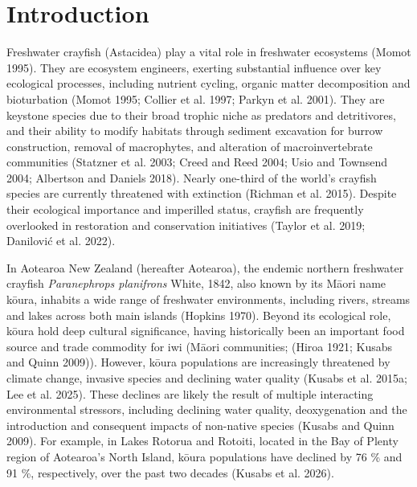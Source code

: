 \documentclass[
  12pt,
  a4paper,
  oneside]{scrbook}
\begin{document}
\section{Introduction}\label{introduction-1}

Freshwater crayfish (Astacidea) play a vital role in freshwater
ecosystems (Momot 1995). They are ecosystem engineers, exerting
substantial influence over key ecological processes, including nutrient
cycling, organic matter decomposition and bioturbation (Momot 1995;
Collier et al. 1997; Parkyn et al. 2001). They are keystone species due
to their broad trophic niche as predators and detritivores, and their
ability to modify habitats through sediment excavation for burrow
construction, removal of macrophytes, and alteration of
macroinvertebrate communities (Statzner et al. 2003; Creed and Reed
2004; Usio and Townsend 2004; Albertson and Daniels 2018). Nearly
one-third of the world's crayfish species are currently threatened with
extinction (Richman et al. 2015). Despite their ecological importance
and imperilled status, crayfish are frequently overlooked in restoration
and conservation initiatives (Taylor et al. 2019; Danilović et al.
2022).

In Aotearoa New Zealand (hereafter Aotearoa), the endemic northern
freshwater crayfish \emph{Paranephrops planifrons} White, 1842, also
known by its Māori name kōura, inhabits a wide range of freshwater
environments, including rivers, streams and lakes across both main
islands (Hopkins 1970). Beyond its ecological role, kōura hold deep
cultural significance, having historically been an important food source
and trade commodity for iwi (Māori communities; (Hiroa 1921; Kusabs and
Quinn 2009)). However, kōura populations are increasingly threatened by
climate change, invasive species and declining water quality (Kusabs et
al. 2015a; Lee et al. 2025). These declines are likely the result of
multiple interacting environmental stressors, including declining water
quality, deoxygenation and the introduction and consequent impacts of
non-native species (Kusabs and Quinn 2009). For example, in Lakes
Rotorua and Rotoiti, located in the Bay of Plenty region of Aotearoa's
North Island, kōura populations have declined by 76 \% and 91 \%,
respectively, over the past two decades (Kusabs et al. 2026).
\end{document}
